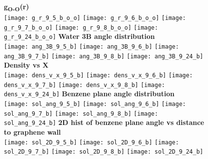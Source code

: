 \documentclass[journal=acsnano,manuscript=article]{achemso}
\begin{document}
\begin{figure}[h!]
	\centering
	\textbf{g\textsubscript{O-O}(r)} \\
	\texttt{[image: g\_r\_9\_5\_b\_o\_o]} 
	\texttt{[image: g\_r\_9\_6\_b\_o\_o]}
	\texttt{[image: g\_r\_9\_7\_b\_o\_o]}
	\texttt{[image: g\_r\_9\_8\_b\_o\_o]}
	\texttt{[image: g\_r\_9\_24\_b\_o\_o]}
	\textbf{Water 3B angle distribution} \\
	\texttt{[image: ang\_3B\_9\_5\_b]} 
	\texttt{[image: ang\_3B\_9\_6\_b]}
	\texttt{[image: ang\_3B\_9\_7\_b]}
	\texttt{[image: ang\_3B\_9\_8\_b]}
	\texttt{[image: ang\_3B\_9\_24\_b]} \\
	\textbf{Density vs X} \\
	\texttt{[image: dens\_v\_x\_9\_5\_b]} 
	\texttt{[image: dens\_v\_x\_9\_6\_b]}
	\texttt{[image: dens\_v\_x\_9\_7\_b]}
	\texttt{[image: dens\_v\_x\_9\_8\_b]}
	\texttt{[image: dens\_v\_x\_9\_24\_b]}
	\textbf{Benzene plane angle distribution} \\
	\texttt{[image: sol\_ang\_9\_5\_b]} 
	\texttt{[image: sol\_ang\_9\_6\_b]}
	\texttt{[image: sol\_ang\_9\_7\_b]}
	\texttt{[image: sol\_ang\_9\_8\_b]}
	\texttt{[image: sol\_ang\_9\_24\_b]}
	\textbf{2D hist of benzene plane angle vs distance to graphene wall} \\
	\texttt{[image: sol\_2D\_9\_5\_b]} 
	\texttt{[image: sol\_2D\_9\_6\_b]}
	\texttt{[image: sol\_2D\_9\_7\_b]}
	\texttt{[image: sol\_2D\_9\_8\_b]}
	\texttt{[image: sol\_2D\_9\_24\_b]}
	\label{fig:gr_9extra}
\end{figure}
\end{document}
